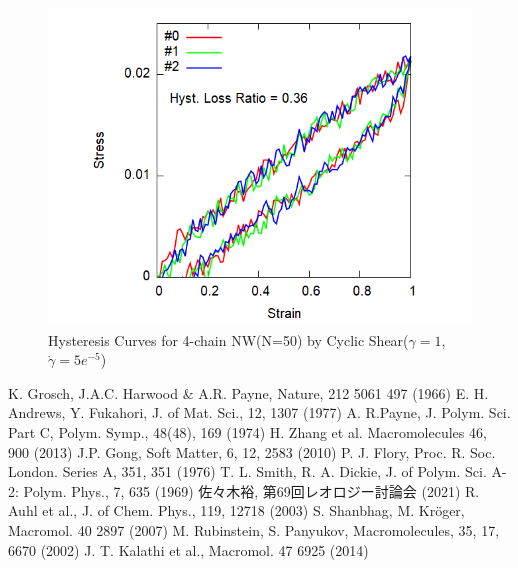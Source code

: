 \documentclass[uplatex,dvipdfmx,a4paper,10pt]{jsarticle}
\begin{document}
\begin{figure}[hb]
\begin{minipage}{0.33\hsize}
	\begin{center}
        \includegraphics[width=.9\textwidth]{CyclicDeform_4chain_N50_rate5e-5.png}
        \caption{Hysteresis Curves for 4-chain NW(N=50) by Cyclic Shear($\gamma = 1$, $\dot{\gamma} = 5e^{-5}$)}
        \label{fig:hystloss}
	\end{center}
\end{minipage}
\end{figure}

\vspace{-7mm}
\begin{thebibliography}{99}
     K. Grosch, J.A.C. Harwood \& A.R. Payne, Nature, 212 5061 497 (1966)
     E. H. Andrews, Y. Fukahori, J. of Mat. Sci., 12, 1307 (1977)
     A. R.Payne, J. Polym. Sci. Part C, Polym. Symp., 48(48), 169 (1974)
     H. Zhang et al. Macromolecules 46, 900 (2013)
     J.P. Gong, Soft Matter, 6, 12, 2583 (2010)
     P. J. Flory, Proc. R. Soc. London. Series A, 351, 351 (1976)
     T. L. Smith, R. A. Dickie, J. of Polym. Sci. A-2: Polym. Phys., 7, 635 (1969)
     佐々木裕, 第69回レオロジー討論会 (2021)
     R. Auhl et al., J. of Chem. Phys., 119, 12718 (2003)
     S. Shanbhag, M. Kr\"{o}ger, Macromol. 40 2897 (2007)
     M. Rubinstein, S. Panyukov, Macromolecules, 35, 17, 6670 (2002)
     J. T. Kalathi et al., Macromol. 47 6925 (2014)
\end{thebibliography}


\end{document}
